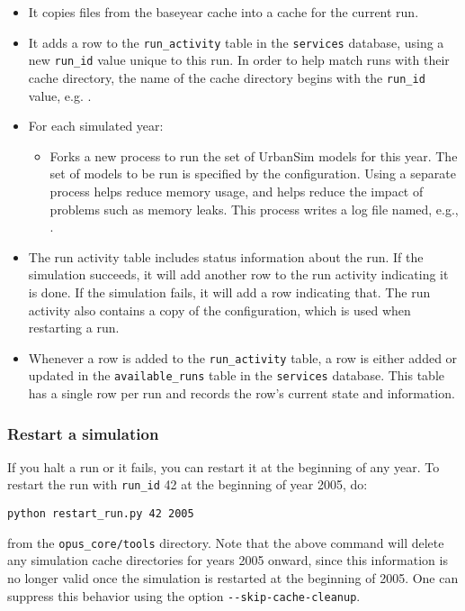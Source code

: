 \begin{itemize}
\item It copies files from the baseyear cache into
a cache for the current run.
\item It adds a row to the \verb|run_activity| table in the \verb|services|
database, using a new \verb|run_id| value unique to this run. In order to help
match runs with their cache directory, the name of the cache directory begins
with the \verb|run_id| value, e.g. .
\item For each simulated year:
  \begin{itemize}
  \item Forks a new process to run the set of UrbanSim models \modelsindex for this year.
  The set of models \modelsindex to be run is specified by the configuration. Using a
  separate process helps reduce memory usage,  and helps reduce the impact of problems such as memory leaks.  This
  process writes a log file named, e.g., .
  \end{itemize}
 \item The run activity table includes status information about the run.  If
  the simulation succeeds, it will add another row to the run activity
  indicating it is done.  If the simulation fails, it will add a row indicating
  that.  The run activity also contains a copy of the configuration, which is
  used when restarting a run.
  \item Whenever a row is added to the \verb|run_activity| table, a row is
  either added or updated in the \verb|available_runs| table in the
  \verb|services| database. This table has a single row per run and records the
  row's current state and information.
\end{itemize}

\subsubsection{Restart a simulation}
If you halt a run or it fails, you can restart it at the beginning of any year.
To restart the run with \verb|run_id| 42 at the beginning of year 2005, do:
\pythonindex
\begin{verbatim}
python restart_run.py 42 2005
\end{verbatim}
from the \verb|opus_core/tools| directory. Note that the above command will delete any
simulation cache \simulationcacheindex directories for years 2005 onward, since
this information is no longer valid once the simulation is restarted at the
beginning of 2005. One can suppress this behavior using the option \verb|--skip-cache-cleanup|.

